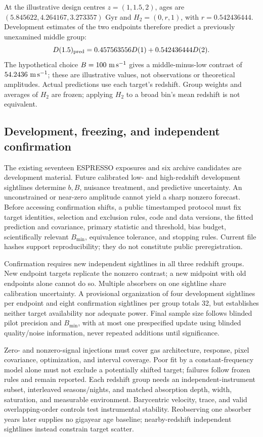 At the illustrative design centres $z=(1,1.5,2)$, ages are
$(5.845622,4.264167,3.273357)$ Gyr and $H_2=(0,r,1)$, with
$r=0.542436444$.  Development estimates of the two endpoints therefore predict
a previously unexamined middle group:
\begin{equation}
 D(1.5)_{\rm pred}=0.457563556D(1)+0.542436444D(2).
 \label{app:midpoint_prediction}
\end{equation}
The hypothetical choice $B=100\ {\rm m\,s^{-1}}$ gives a middle-minus-low
contrast of $54.2436\ {\rm m\,s^{-1}}$; these are illustrative values, not
observations or theoretical amplitudes.  Actual predictions use each target's
redshift.  Group weights and averages of $H_2$ are frozen; applying $H_2$ to a
broad bin's mean redshift is not equivalent.

\subsection{Development, freezing, and independent confirmation}
\label{app:prediction_samples}

The existing seventeen ESPRESSO exposures and six archive candidates are
development material.  Future calibrated low- and high-redshift development
sightlines determine $b,B$, nuisance treatment, and predictive uncertainty.
An unconstrained or near-zero amplitude cannot yield a sharp nonzero
forecast.  Before accessing confirmation shifts, a public timestamped protocol
must fix target identities, selection and exclusion rules, code and data
versions, the fitted prediction and covariance, primary statistic and
threshold, bias budget, scientifically relevant $B_{\min}$, equivalence
tolerance, and stopping rules.  Current file hashes support reproducibility;
they do not constitute public preregistration.

Confirmation requires new independent sightlines in all three redshift
groups.  New endpoint targets replicate the nonzero contrast; a new midpoint
with old endpoints alone cannot do so.  Multiple absorbers on one sightline
share calibration uncertainty.  A provisional organization of four
development sightlines per endpoint and eight confirmation sightlines per
group totals 32, but establishes neither target availability nor adequate
power.  Final sample size follows blinded pilot precision and $B_{\min}$,
with at most one prespecified update using blinded quality/noise information,
never repeated additions until significance.

Zero- and nonzero-signal injections must cover gas architecture, response,
pixel covariance, optimization, and interval coverage.  Poor fit by a
constant-frequency model alone must not exclude a potentially shifted target;
failures follow frozen rules and remain reported.  Each redshift group needs
an independent-instrument subset, interleaved seasons/nights, and matched
absorption depth, width, saturation, and measurable environment.  Barycentric
velocity, trace, and valid overlapping-order controls test instrumental
stability.  Reobserving one absorber years later supplies no gigayear age
baseline; nearby-redshift independent sightlines instead constrain target
scatter.

